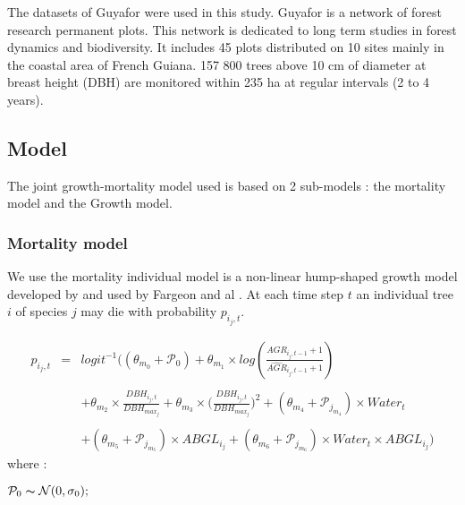 \documentclass[review]{elsarticle}
\begin{document}
\noindent The datasets of Guyafor were used in this study. Guyafor is a network of forest research permanent plots. This network is dedicated to long term studies in forest dynamics and biodiversity. It includes 45 plots distributed on 10 sites mainly in the coastal area of French Guiana. 157 800 trees above 10 cm of diameter at breast height (DBH) are monitored within 235 ha at regular intervals (2 to 4 years). 


\newpage
\subsection{Model}  
The joint growth-mortality model used is based on 2 sub-models : the mortality model and the Growth model.
\subsubsection{Mortality model}
\noindent We use the mortality individual model is a non-linear hump-shaped growth model developed  by \cite{Herault} and used by Fargeon and al \cite{Fargeon}.   At each time step $t$ an individual tree $i$ of species $j$ may die with probability $ p_{i_{j},t}.$

\begin{equation}\label{modele_mortalite}
\begin{array}{lcl}
  p_{i_{j},t} & =  & logit^{-1} \Big((\theta_{m_{0}} + \mathcal{P}_{0}) +\theta_{m_{1}} \times 
 log \left(\frac{AGR_{i_{j},t-1}+1}{\widehat{AGR}_{i_{j},t-1}+1}\right)\\\\
 && +\theta_{m_{2}}\times \frac{DBH_{i_{j},t}}{DBH_{max_{j}}}+\theta_{m_{3}}\times  \Big(\frac{DBH_{i_{j},t}}{DBH_{max_{j}}}\Big)^2+(\theta_{m_{4}}+\mathcal{P}_{j_{m_{4}}})\times Water_{t} \\\\
 && + (\theta_{m_{5}}+\mathcal{P}_{j_{m_{5}}}) \times ABGL_{i_{j}} +(\theta_{m_{6}}+\mathcal{P}_{j_{m_{6}}} ) \times Water_{t} \times ABGL_{i_{j}}\Big)
 \end{array}
\end{equation}
\noindent where :

$\mathcal{P}_{0} \thicksim \mathcal{N}(0,\sigma_{0});$ 
\end{document}
